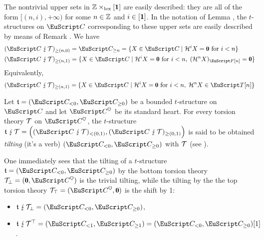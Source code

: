 \begin{remark}\label{rem.explicit.tilt}
The nontrivial upper sets in $\mathbb{Z} \times_{\mathrm{lex}} [\mathbf{1}]$ are easily described: they are all of the form $[(n,i),+\infty)$ for some $n\in \mathbb{Z}$ and $i\in [\mathbf{1}]$. In the notation of Lemma , the $t$-structures on $\C$ corresponding to these upper sets are easily described by means of Remark . We have
\begin{align*}
(\C\tilted\T)_{\geq (n,0)} &=\C_{\geq n}=\{X \in \C \mid \mathcal{H}^iX=\zero \text{ for } i<n\}\\
(\C\tilted\T)_{\geq (n,1)} &=\{X \in \C \mid \mathcal{H}^iX=\zero \text{ for } i<n, \; (\mathcal{H}^nX)_{\cate{F}[n]}=\zero\}
\end{align*}
Equivalently,
\[
(\C\tilted\T)_{\geq (n,1)}=\{X \in \C \mid \mathcal{H}^iX=\zero \text{ for } i<n,\; \mathcal{H}^nX\in \cate{T}[n]\}
\] 
\end{remark}

\begin{definition}\label{def.tilting}
Let $\tee=(\C_{<0},\C_{\ge 0})$ be a bounded $t$-structure on $\C$ and let $\C^\heart$ be its standard heart. For every torsion theory $\mathcal{T}$ on $\C^\heart$, the $t$-structure $\tee\tilted\T  = \Big((\C\tilted\T)_{< (0,1)} , (\C\tilted\T)_{\ge (0,1)}\Big)$ is said to be obtained \emph{tilting} (it's a verb) $(\C_{ < 0},\C_{\ge 0})$ with $\mathcal{T}$ (see \cite{Beligiannisreiten}).
\end{definition}

\begin{remark}\label{trivial.tilting}
One immediately sees that the tilting of a $t$-structure $\tee=(\C_{< 0},\C_{ \ge 0})$ by the bottom torsion theory $\T_\perp = (\zero,\C^\heart)$ is the trivial tilting, %
while the tilting by the the top torsion theory $\T_\top = (\C^\heart,\zero)$
is the shift by 1:
\begin{itemize}
 	\item $\tee\tilted\T_\perp = %
 	(\C_{< 0},\C_{\ge 0})$,
 	\item $\tee\tilted\T^\top  = %
 	(\C_{< 1},\C_{\ge 1})=(\C_{< 0},\C_{\ge 0})[1]$.
 \end{itemize} 
\end{remark}

